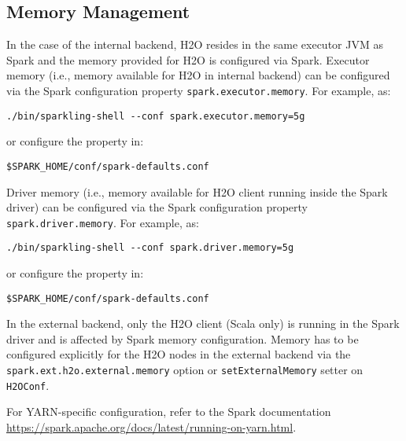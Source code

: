 \subsection{Memory Management}

In the case of the internal backend, H2O resides in the same executor JVM as Spark and the memory provided for H2O is configured
via Spark.
Executor memory (i.e., memory available for H2O in internal backend) can be configured via the Spark configuration
property \texttt{spark.executor.memory}. For example, as:

\begin{lstlisting}[style=bash]
./bin/sparkling-shell --conf spark.executor.memory=5g
\end{lstlisting}

or configure the property in:

\begin{lstlisting}[style=bash]
$SPARK_HOME/conf/spark-defaults.conf
\end{lstlisting}

Driver memory (i.e., memory available for H2O client running inside the Spark driver) can be configured via the Spark
configuration property \texttt{spark.driver.memory}. For example, as:

\begin{lstlisting}[style=bash]
./bin/sparkling-shell --conf spark.driver.memory=5g
\end{lstlisting}

or configure the property in:

\begin{lstlisting}[style=bash]
$SPARK_HOME/conf/spark-defaults.conf
\end{lstlisting}

In the external backend, only the H2O client (Scala only) is running in the Spark driver and is affected by Spark
memory configuration. Memory has to be configured explicitly for the H2O nodes in the external backend via the
\texttt{spark.ext.h2o.external.memory} option or \texttt{setExternalMemory} setter on \texttt{H2OConf}.

For YARN-specific configuration, refer to the Spark documentation \url{https://spark.apache.org/docs/latest/running-on-yarn.html}.
